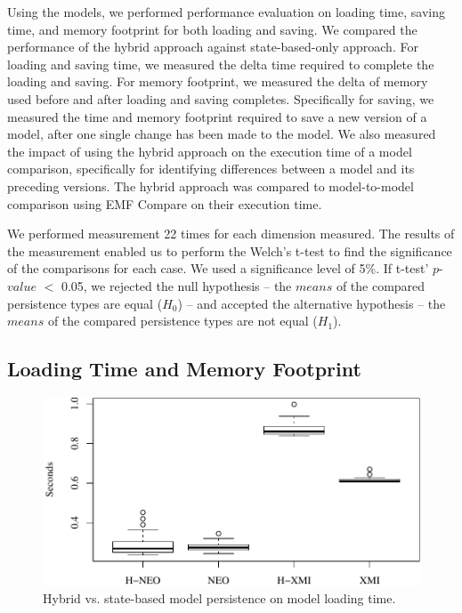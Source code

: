\documentclass[10pt,conference]{IEEEtran}
\begin{document}
Using the models, we performed performance evaluation on loading time, saving time, and memory footprint for both loading and saving. We compared the performance of the hybrid approach against state-based-only approach. For loading and saving time, we measured the delta time required to complete the loading and saving. For memory footprint, we measured the delta of memory used before and after loading and saving completes. Specifically for saving, we measured the time and memory footprint required to save a new version of a model, after one single change has been made to the model. We also measured the impact of using the hybrid approach on the execution time of a model comparison, specifically for identifying differences between a model and its preceding versions. The hybrid approach was compared to model-to-model comparison using EMF Compare on their execution time.

We performed measurement 22 times for each dimension measured. The results of the measurement enabled us to perform the Welch's t-test \cite{welch1947ttest} to find the significance of the comparisons for each case. We used a significance level of 5\%. If t-test' $p$-$value$ $<$ 0.05, we rejected the null hypothesis -- the $means$ of the compared persistence types are equal ($H_0$) -- and accepted the alternative hypothesis -- the $means$ of the compared persistence types are not equal ($H_1$).  

\subsection{Loading Time and Memory Footprint}
\label{sec:model_loading_time}

\begin{figure}[ht]
        \includegraphics[width=\linewidth]{images/load_time_epsilon}
    \caption{Hybrid vs. state-based model persistence on model loading time.}
            \label{fig:load_time_epsilon}
\end{figure}
\end{document}
